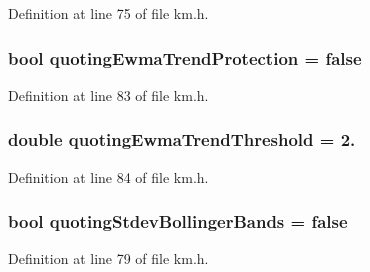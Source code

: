 Definition at line 75 of file km.\+h.

\subsubsection[{\texorpdfstring{quoting\+Ewma\+Trend\+Protection}{quotingEwmaTrendProtection}}]{\setlength{\rightskip}{0pt plus 5cm}bool quoting\+Ewma\+Trend\+Protection = false}\hypertarget{struct_k_1_1m_quoting_params_a61b6dfbdc7421efd1a7a7fa36c127ffb}{}\label{struct_k_1_1m_quoting_params_a61b6dfbdc7421efd1a7a7fa36c127ffb}


Definition at line 83 of file km.\+h.

\subsubsection[{\texorpdfstring{quoting\+Ewma\+Trend\+Threshold}{quotingEwmaTrendThreshold}}]{\setlength{\rightskip}{0pt plus 5cm}double quoting\+Ewma\+Trend\+Threshold = 2.}\hypertarget{struct_k_1_1m_quoting_params_a14356d95d1c4c6a1c0cfadd22ffbfe3e}{}\label{struct_k_1_1m_quoting_params_a14356d95d1c4c6a1c0cfadd22ffbfe3e}


Definition at line 84 of file km.\+h.

\subsubsection[{\texorpdfstring{quoting\+Stdev\+Bollinger\+Bands}{quotingStdevBollingerBands}}]{\setlength{\rightskip}{0pt plus 5cm}bool quoting\+Stdev\+Bollinger\+Bands = false}\hypertarget{struct_k_1_1m_quoting_params_aa0fa38752190501ff21345250e62a843}{}\label{struct_k_1_1m_quoting_params_aa0fa38752190501ff21345250e62a843}


Definition at line 79 of file km.\+h.

